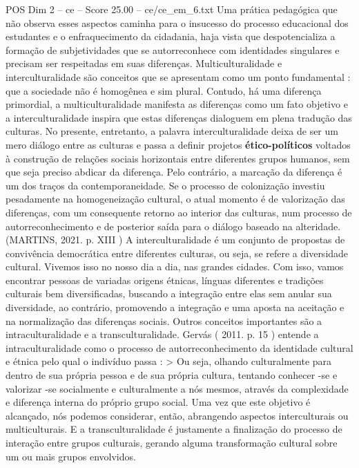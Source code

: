 \begin{textsample}{POS Dim 2 – ce – Score 25.00 – ce/ce\_em\_6.txt}
Uma prática pedagógica que não observa esses aspectos caminha para o insucesso do processo educacional dos estudantes e o enfraquecimento da cidadania, haja vista que despotencializa a formação de subjetividades que se autorreconhece com identidades singulares e precisam ser respeitadas em suas diferenças.
Multiculturalidade e interculturalidade são conceitos que se apresentam como um ponto fundamental : que a sociedade não é homogênea e sim plural.
Contudo, há uma diferença primordial, a multiculturalidade manifesta as diferenças como um fato objetivo e a interculturalidade inspira que estas diferenças dialoguem em plena tradução das culturas.
No presente, entretanto, a palavra interculturalidade deixa de ser um mero diálogo entre as culturas e passa a definir projetos \textbf{ético-políticos} voltados à construção de relações sociais horizontais entre diferentes grupos humanos, sem que seja preciso abdicar da diferença.
Pelo contrário, a marcação da diferença é um dos traços da contemporaneidade.
Se o processo de colonização investiu pesadamente na homogeneização cultural, o atual momento é de valorização das diferenças, com um consequente retorno ao interior das culturas, num processo de autorreconhecimento e de posterior saída para o diálogo baseado na alteridade.(MARTINS, 2021. p.
XIII ) A interculturalidade é um conjunto de propostas de convivência democrática entre diferentes culturas, ou seja, se refere a diversidade cultural.
Vivemos isso no nosso dia a dia, nas grandes cidades.
Com isso, vamos encontrar pessoas de variadas origens étnicas, línguas diferentes e tradições culturais bem diversificadas, buscando a integração entre elas sem anular sua diversidade, ao contrário, promovendo a integração e uma aposta na aceitação e na normalização das diferenças sociais.
Outros conceitos importantes são a intraculturalidade e a transculturalidade.
Gervás ( 2011. p. 15 ) entende a intraculturalidade como o processo de autorreconhecimento da identidade cultural e étnica pelo qual o indivíduo passa : > Ou seja, olhando culturalmente para dentro de sua própria pessoa e de sua própria cultura, tentando conhecer -se e valorizar -se socialmente e culturalmente a nós mesmos, através da complexidade e diferença interna do próprio grupo social.
Uma vez que este objetivo é alcançado, nós podemos considerar, então, abrangendo aspectos interculturais ou multiculturais.
E a transculturalidade é justamente a finalização do processo de interação entre grupos culturais, gerando alguma transformação cultural sobre um ou mais grupos envolvidos.

\end{textsample}
